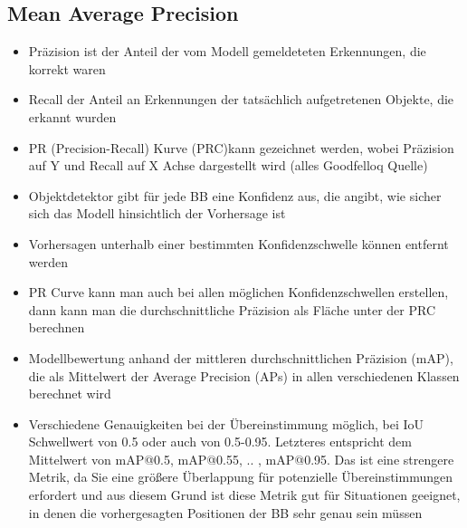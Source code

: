 \subsection{Mean Average Precision}
\begin{itemize}
    \item Präzision ist der Anteil der vom Modell gemeldeteten Erkennungen, die korrekt waren 
    \item Recall der Anteil an Erkennungen der tatsächlich aufgetretenen Objekte, die erkannt wurden
    \item PR (Precision-Recall) Kurve (PRC)kann gezeichnet werden, wobei Präzision auf Y und Recall auf X Achse dargestellt wird (alles Goodfelloq Quelle)
    \item Objektdetektor gibt für jede BB eine Konfidenz aus, die angibt, wie sicher sich das Modell hinsichtlich der Vorhersage ist
    \item Vorhersagen unterhalb einer bestimmten Konfidenzschwelle können entfernt werden
    \item PR Curve kann man auch bei allen möglichen Konfidenzschwellen  erstellen, dann kann man die durchschnittliche Präzision als Fläche unter der PRC berechnen
    \item Modellbewertung anhand der mittleren durchschnittlichen Präzision (mAP), die als Mittelwert der Average Precision (APs) in allen verschiedenen Klassen berechnet wird \cite{Rainio2024}
    \item Verschiedene Genauigkeiten bei der Übereinstimmung möglich, bei IoU Schwellwert von 0.5 oder auch von 0.5-0.95. Letzteres entspricht dem Mittelwert von mAP@0.5, mAP@0.55, .. , mAP@0.95. Das ist eine strengere Metrik, da Sie eine größere Überlappung für potenzielle Übereinstimmungen erfordert und aus diesem Grund ist diese Metrik gut für Situationen geeignet, in denen die vorhergesagten Positionen der BB sehr genau sein müssen
\end{itemize}




